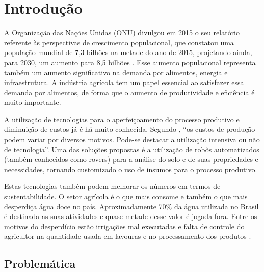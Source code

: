 \chapter{Introdução}

  A Organização das Nações Unidas (ONU) divulgou em 2015 o seu relatório referente
  às perspectivas de crescimento populacional, que constatou uma população mundial
  de 7,3 bilhões na metade do ano de 2015, projetando ainda, para 2030, um aumento
  para 8,5 bilhões \cite{ONU2015}. Esse aumento populacional representa também um
  aumento significativo na demanda por alimentos, energia e infraestrutura.
  A indústria agrícola tem um papel essencial ao satisfazer essa demanda por alimentos,
  de forma que o aumento de produtividade e eficiência é muito importante.

  A utilização de tecnologias para o aperfeiçoamento do processo produtivo e
  diminuição de custos já é há muito conhecida. Segundo \cite{RAMIZ1988},
  “os custos de produção podem variar por diversos motivos. Pode-se destacar a
  utilização intensiva ou não de tecnologia”. Uma das soluções propostas é a
  utilização de robôs automatizados (também conhecidos como rovers) para a
  análise do solo e de suas propriedades e necessidades, tornando customizado
  o uso de insumos para o processo produtivo.

  Estas tecnologias também podem melhorar os números em termos de sustentabilidade.
  O setor agrícola é o que mais consome e também o que mais desperdiça água doce no país.
  Aproximadamente 70\% da água utilizada no Brasil é destinada as suas atividades
  e quase metade desse valor é jogada fora. Entre os motivos do desperdício estão
  irrigações mal executadas e falta de controle do agricultor na quantidade usada
  em lavouras e no processamento dos produtos \cite{fao2013}.

  \section{Problemática}

